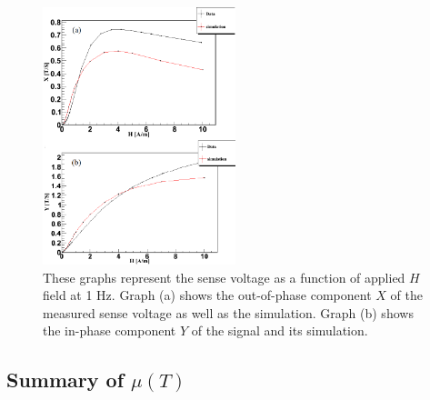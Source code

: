 \documentclass[review]{elsarticle}
\begin{document}
\begin{figure}[h!]
\begin{center}
   \includegraphics[width=0.5\textwidth]{data_and_simulation3.PNG}
    \caption{These graphs represent the sense voltage as a function of applied $H$ field at 1 Hz. Graph (a) shows the out-of-phase component $X$ of the measured sense voltage as well as the simulation. Graph (b) shows the in-phase component $Y$ of the signal and its simulation.}
    \label{fig:data_and_simulation}
    \end{center}
\end{figure} 


\subsection{Summary of $\mu(T)$}
\end{document}
